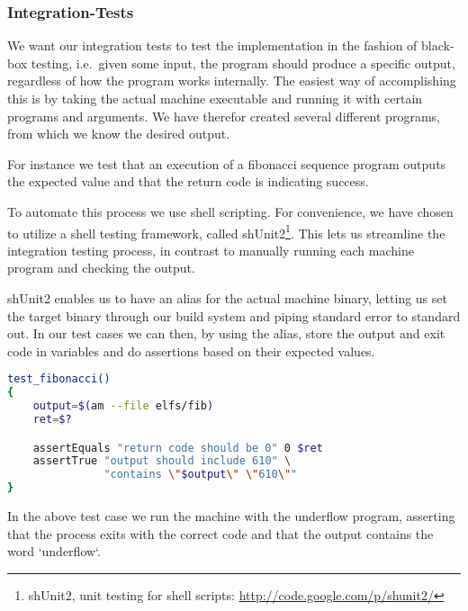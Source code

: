 \subsubsection{Integration-Tests}

We want our integration tests to test the implementation in the fashion of
black-box testing, i.e.~given some input, the program should produce a specific
output, regardless of how the program works internally. The easiest way of
accomplishing this is by taking the actual machine executable and running it
with certain programs and arguments. We have therefor created several different
programs, from which we know the desired output.

For instance we test that an execution of a fibonacci sequence program outputs
the expected value and that the return code is indicating success.

To automate this process we use shell scripting. For convenience, we have chosen
to utilize a shell testing framework, called shUnit2\footnote{shUnit2, unit
  testing for shell scripts: \url{http://code.google.com/p/shunit2/}}. This lets
us streamline the integration testing process, in contrast to manually running
each machine program and checking the output.

shUnit2 enables us to have an alias for the actual machine binary, letting us
set the target binary through our build system and piping standard error to
standard out. In our test cases we can then, by using the alias, store the
output and exit code in variables and do assertions based on their expected
values.

\begin{minipage}{\linewidth}
\begin{lstlisting}[language={sh},caption={shUnit2 underflow test case}]
test_fibonacci()
{
    output=$(am --file elfs/fib)
    ret=$?

    assertEquals "return code should be 0" 0 $ret
    assertTrue "output should include 610" \
               "contains \"$output\" \"610\""
}
\end{lstlisting}
\end{minipage}

In the above test case we run the machine with the underflow program, asserting
that the process exits with the correct code and that the output contains the
word `underflow`.

